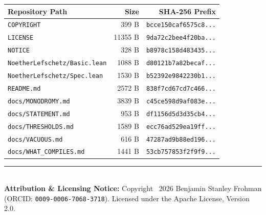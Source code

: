 \documentclass[11pt,a4paper]{article}
\begin{document}
\begin{center}
\small
\begin{tabular}{p{}rr}
\toprule
\textbf{Repository Path} & \textbf{Size} & \textbf{SHA-256 Prefix} \\
\midrule
\texttt{COPYRIGHT} & 399 B & \texttt{bcce150caf6575c8...} \\
\texttt{LICENSE} & 11355 B & \texttt{9da72c2bee4f20ba...} \\
\texttt{NOTICE} & 328 B & \texttt{b8978c158d483435...} \\
\texttt{NoetherLefschetz/Basic.lean} & 1088 B & \texttt{d80121b7a82becaf...} \\
\texttt{NoetherLefschetz/Spec.lean} & 1530 B & \texttt{b52392e9842230b1...} \\
\texttt{README.md} & 2572 B & \texttt{838f7cd67cd7c466...} \\
\texttt{docs/MONODROMY.md} & 3839 B & \texttt{c45ce598d9af083e...} \\
\texttt{docs/STATEMENT.md} & 953 B & \texttt{df1156d5d3d35cb4...} \\
\texttt{docs/THRESHOLDS.md} & 1589 B & \texttt{ecc76ad529ea19ff...} \\
\texttt{docs/VACUOUS.md} & 616 B & \texttt{47287ad9b88ed196...} \\
\texttt{docs/WHAT\_COMPILES.md} & 1441 B & \texttt{53cb757853f2f9f9...} \\
\bottomrule
\end{tabular}
\end{center}

\vfill
\noindent\rule{\textwidth}{0.4pt}\\
\footnotesize
\textbf{Attribution \& Licensing Notice:} Copyright \textcopyright\ 2026 Benjamin Stanley Frohman (ORCID: \texttt{0009-0006-7068-3718}).
Licensed under the Apache License, Version 2.0.
\end{document}
